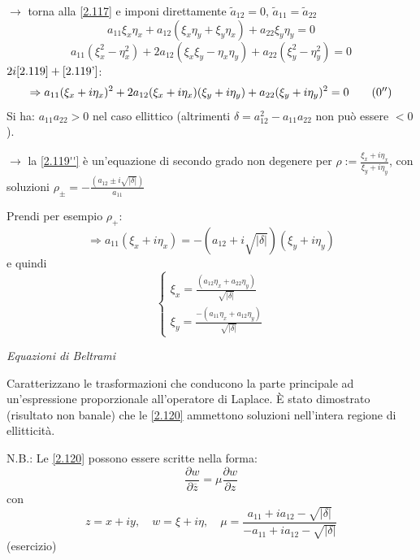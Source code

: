 \documentclass[a4paper,11pt]{report}
\begin{document}
$\rightarrow$ torna alla \eqref{2.117} e imponi direttamente $\tilde{a}_{12}=0$, $\tilde{a}_{11}=\tilde{a}_{22}$
\begin{equation}
a_{11}\xi_x \eta_x + a_{12}(\xi_x\eta_y + \xi_y\eta_x) + a_{22}\xi_y\eta_y=0
\label{2.119}
\end{equation}
\begin{equation}
a_{11}(\xi_x^2 - \eta_x^2) + 2a_{12}(\xi_x\xi_y - \eta_x\eta_y) + a_{22}(\xi_y^2 - \eta_y^2)=0
\label{2.119'}
\tag{$\theequation^\prime$}
\end{equation}
$2i\eqref{2.119} + \eqref{2.119'}$:
\begin{equation}
\Rightarrow a_{11}(\xi_x + i\eta_x)^2 + 2a_{12}(\xi_x + i\eta_x)(\xi_y + i\eta_y) + a_{22}(\xi_y + i\eta_y)^2 =0
\label{2.119''}
\tag{$\theequation^{\prime\prime}$}
\end{equation}
Si ha: $a_{11}a_{22}>0$ nel caso ellittico (altrimenti $\delta =a_{12}^2 - a_{11}a_{22}$ non pu\`o essere $<0$). 

$\rightarrow$ la \eqref{2.119''} \`e un'equazione di secondo grado non degenere per $\rho:= \frac{\xi_x + i\eta_x}{\xi_y + i\eta_y}$, con soluzioni $\rho_{\pm}=-\frac{\left(a_{12} \pm i\sqrt{|\delta|} \right)} { a_{11}}$

Prendi per esempio $\rho_+$:
\[
\Rightarrow a_{11} (\xi_x + i\eta_x)=-(a_{12}+i\sqrt{|\delta|})(\xi_y + i \eta_y)
\]
e quindi 
\begin{equation}
\begin{cases}
\xi_x=\frac{(a_{12}\eta_x + a_{22}\eta_y)}{\sqrt{|\delta|}} \\
\xi_y=\frac{-(a_{11}\eta_x + a_{12}\eta_y)}{\sqrt{|\delta|}}
\end{cases}
\label{2.120}
\end{equation}
\centerline{\emph{Equazioni di Beltrami}}

\medskip

Caratterizzano le trasformazioni che conducono la parte principale ad un'espressione proporzionale all'operatore di Laplace. \`E stato dimostrato (risultato non banale) che le \eqref{2.120} ammettono soluzioni nell'intera regione di ellitticit\`a.

N.B.: Le \eqref{2.120} possono essere scritte nella forma:
\begin{equation}
\frac{\partial w}{\partial \overline{z}}=\mu\frac{\partial w}{\partial z}
\label{2.120'}
\tag{$\theequation^\prime$}
\end{equation}
con
\[
z=x+iy, \quad w=\xi+i\eta, \quad \mu=\frac{a_{11}+i a_{12} - \sqrt{|\delta|}}{-a_{11}+i a_{12} - \sqrt{|\delta|}} 
\]
(esercizio)%
\end{document}
